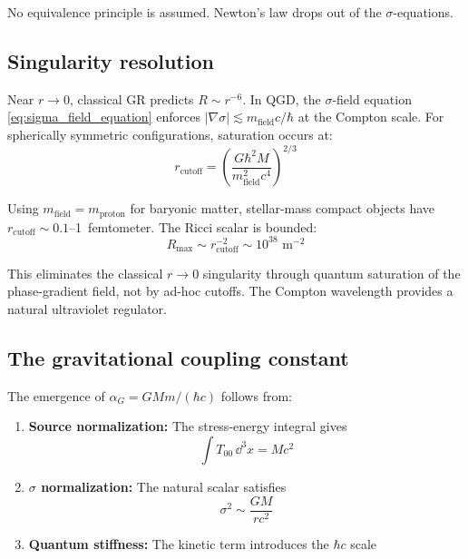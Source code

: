 \documentclass[11pt,a4paper]{article}
\theoremstyle{definition}
\theoremstyle{remark}
\begin{document}
	No equivalence principle is assumed. Newton's law drops out of the $\sigma$-equations.
	
	\subsection{Singularity resolution}
	
	Near $r \to 0$, classical GR predicts $R \sim r^{-6}$. In QGD, the $\sigma$-field equation \eqref{eq:sigma_field_equation} enforces $|\nabla\sigma| \lesssim m_{\text{field}} c/\hbar$ at the Compton scale. For spherically symmetric configurations, saturation occurs at:
	\begin{equation}
		r_{\text{cutoff}} = \left(\frac{G\hbar^2 M}{m_{\text{field}}^2 c^4}\right)^{2/3}
		\label{eq:cutoff_radius}
	\end{equation}
	
	Using $m_{\text{field}} = m_{\text{proton}}$ for baryonic matter, stellar-mass compact objects have $r_{\text{cutoff}} \sim 0.1$--1~femtometer. The Ricci scalar is bounded:
	\begin{equation}
		R_{\text{max}} \sim r_{\text{cutoff}}^{-2} \sim 10^{38}\text{ m}^{-2}
		\label{eq:ricci_max}
	\end{equation}
	
	This eliminates the classical $r \to 0$ singularity through quantum saturation of the phase-gradient field, not by ad-hoc cutoffs. The Compton wavelength provides a natural ultraviolet regulator.
	
	\subsection{The gravitational coupling constant}
	
	The emergence of $\alpha_G = GMm/(\hbar c)$ follows from:
	\begin{enumerate}
		\item \textbf{Source normalization:} The stress-energy integral gives
		\begin{equation}
			\int T_{00} \, \dd^3x = Mc^2
			\label{eq:source_norm}
		\end{equation}
		
		\item \textbf{$\sigma$ normalization:} The natural scalar satisfies
		\begin{equation}
			\sigma^2 \sim \frac{GM}{rc^2}
			\label{eq:sigma_norm}
		\end{equation}
		
		\item \textbf{Quantum stiffness:} The kinetic term introduces the $\hbar c$ scale
	\end{enumerate}
	
\end{document}
